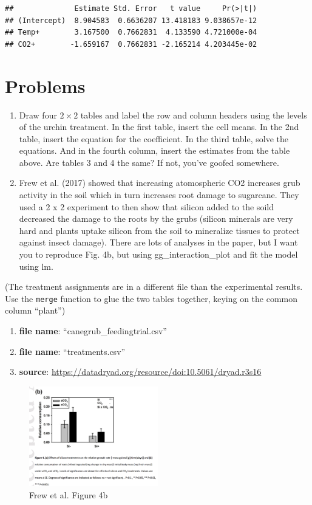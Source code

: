 \documentclass[]{book}
\providecommand{\tightlist}{%
  \setlength{\itemsep}{0pt}\setlength{\parskip}{0pt}}
\begin{document}
\begin{verbatim}
##              Estimate Std. Error   t value     Pr(>|t|)
## (Intercept)  8.904583  0.6636207 13.418183 9.038657e-12
## Temp+        3.167500  0.7662831  4.133590 4.721000e-04
## CO2+        -1.659167  0.7662831 -2.165214 4.203445e-02
\end{verbatim}

\section{Problems}\label{problems-3}

\begin{enumerate}
\def\labelenumi{\arabic{enumi}.}
\item
  Draw four \(2 \times 2\) tables and label the row and column headers
  using the levels of the urchin treatment. In the first table, insert
  the cell means. In the 2nd table, insert the equation for the
  coefficient. In the third table, solve the equations. And in the
  fourth column, insert the estimates from the table above. Are tables 3
  and 4 the same? If not, you've goofed somewhere.
\item
  Frew et al. (2017) showed that increasing atomospheric CO2 increases
  grub activity in the soil which in turn increases root damage to
  sugarcane. They used a 2 x 2 experiment to then show that silicon
  added to the soild decreased the damage to the roots by the grubs
  (silicon minerals are very hard and plants uptake silicon from the
  soil to mineralize tissues to protect against insect damage). There
  are lots of analyses in the paper, but I want you to reproduce Fig.
  4b, but using gg\_interaction\_plot and fit the model using lm.
\end{enumerate}

(The treatment assignments are in a different file than the experimental
results. Use the \texttt{merge} function to glue the two tables
together, keying on the common column ``plant'')

\begin{enumerate}
\def\labelenumi{\arabic{enumi}.}
\tightlist
\item
  \textbf{file name}: ``canegrub\_feedingtrial.csv''
\item
  \textbf{file name}: ``treatments.csv''
\item
  \textbf{source}:
  \url{https://datadryad.org/resource/doi:10.5061/dryad.r3s16}
\end{enumerate}

\begin{figure}
\centering
\includegraphics[width=0.50000\textwidth]{images/frew_fig_4b.png}
\caption{Frew et al. Figure 4b}
\end{figure}
\end{document}
